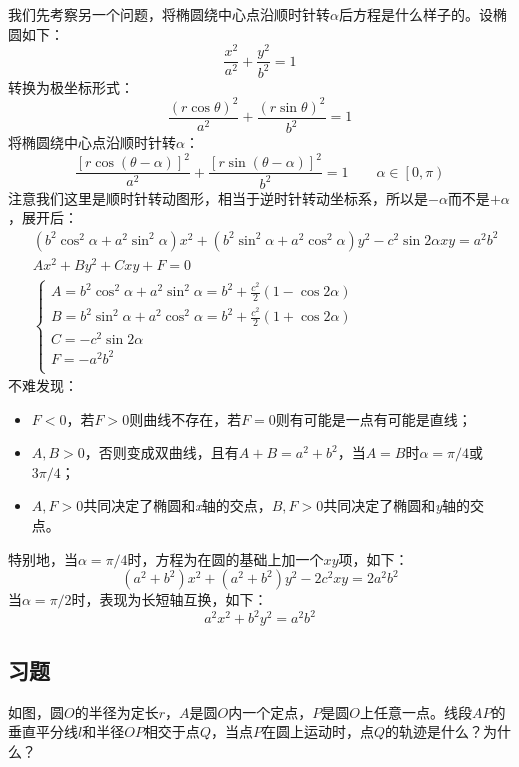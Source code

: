 我们先考察另一个问题，将椭圆绕中心点沿顺时针转$\alpha $后方程是什么样子的。设椭圆如下：
\[
\frac{x^2}{a^2}+\frac{y^2}{b^2}=1
\]
转换为极坐标形式：
\[
\frac{\left( r\cos \theta \right) ^2}{a^2}+\frac{\left( r\sin \theta \right) ^2}{b^2}=1
\]
将椭圆绕中心点沿顺时针转$\alpha $：
\[
\frac{\left[ r\cos \left( \theta -\alpha \right) \right] ^2}{a^2}+\frac{\left[ r\sin \left( \theta -\alpha \right) \right] ^2}{b^2}=1 \qquad \alpha \in \left[ 0,\pi \right)
\]
注意我们这里是顺时针转动图形，相当于逆时针转动坐标系，所以是$-\alpha $而不是$+\alpha $，展开后：
\begin{align*}
&\left( b^2\cos ^2\alpha +a^2\sin ^2\alpha \right) x^2+\left( b^2\sin ^2\alpha +a^2\cos ^2\alpha \right) y^2-c^2\sin 2\alpha xy=a^2b^2 \\
&Ax^2+By^2+Cxy+F=0 \\
&\begin{cases}
	A=b^2\cos ^2\alpha +a^2\sin ^2\alpha =b^2+\frac{c^2}{2}\left( 1-\cos 2\alpha \right)\\
	B=b^2\sin ^2\alpha +a^2\cos ^2\alpha =b^2+\frac{c^2}{2}\left( 1+\cos 2\alpha \right)\\
	C=-c^2\sin 2\alpha\\
	F=-a^2b^2\\
\end{cases}
\end{align*}
不难发现：
\begin{itemize}
    \item $F<0$，若$F>0$则曲线不存在，若$F=0$则有可能是一点有可能是直线；
    \item $A,B>0$，否则变成双曲线，且有$A+B=a^2+b^2$，当$A=B$时$\alpha =\pi /4$或$3\pi /4$；
    \item $A,F>0$共同决定了椭圆和{\it x}轴的交点，$B,F>0$共同决定了椭圆和{\it y}轴的交点。
\end{itemize}
特别地，当$\alpha =\pi /4$时，方程为在圆的基础上加一个$xy$项，如下：
\[
\left( a^2+b^2 \right) x^2+\left( a^2+b^2 \right) y^2-2c^2xy=2a^2b^2
\]
当$\alpha =\pi /2$时，表现为长短轴互换，如下：
\[
a^2x^2+b^2y^2=a^2b^2
\]

\subsection{习题}

\begin{example}
如图，圆$O$的半径为定长$r$，$A$是圆$O$内一个定点，$P$是圆$O$上任意一点。线段$AP$的垂直平分线$l$和半径$OP$相交于点$Q$，当点$P$在圆上运动时，点$Q$的轨迹是什么？为什么？
\end{example}


